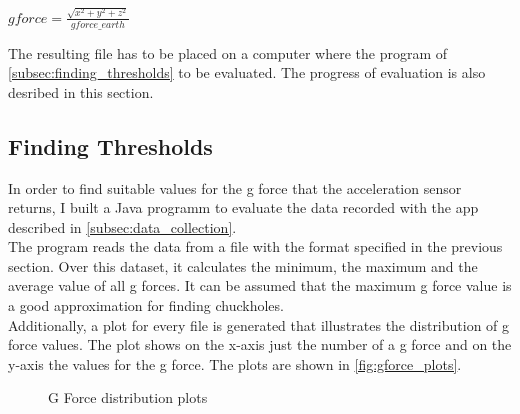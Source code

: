 \documentclass[10pt,a4paper]{article} %
\begin{document}
		\begin{center}
			$ gforce = \frac{\sqrt{x^2 + y^2 + z^2}}{gforce\_earth} $
		\end{center}

		The resulting file has to be placed on a computer where the program of \autoref{subsec:finding_thresholds} to be evaluated.
		The progress of evaluation is also desribed in this section.
		
	\subsection{Finding Thresholds}\label{subsec:finding_thresholds}

		In order to find suitable values for the g force that the acceleration sensor returns, I built a Java programm to evaluate the data recorded with the app described in \autoref{subsec:data_collection}.\\
		The program reads the data from a file with the format specified in the previous section.
		Over this dataset, it calculates the minimum, the maximum and the average value of all g forces.
		It can be assumed that the maximum g force value is a good approximation for finding chuckholes.\\
		Additionally, a plot for every file is generated that illustrates the distribution of g force values.
		The plot shows on the x-axis just the number of a g force and on the y-axis the values for the g force.
		The plots are shown in \autoref{fig:gforce_plots}.

		\begin{figure}[H]
	  \centering
	  \hfill
	  \caption{G Force distribution plots}
	  \label{fig:gforce_plots}
	\end{figure}
\end{document}
